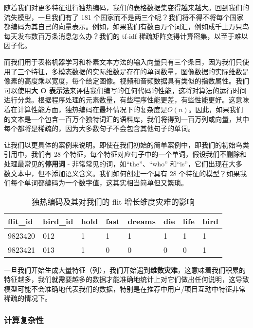 \documentclass[Chinese, 11pt, table]{diazessay} %
\begin{document}
\begin{CJK}{UTF8}{gbsn}
\begin{sloppypar}
随着我们对更多特征进行独热编码，我们的表格数据集变得越来越大。回到我们的流失模型，一旦我们有了 181 个国家而不是两三个呢？我们将不得不将每个国家都编码为其自己的向量表示。例如，如果我们有数百万个词汇，例如成千上万只鸟每天发布数百万条消息怎么办？我们的 tf-idf 稀疏矩阵变得计算密集，以至于难以因子化。

而我们用于表格机器学习和朴素文本方法的输入向量只有三个条目，因为我们只使用了三个特征，多模态数据的实际维数是存在的单词数量，图像数据的实际维数是像素的高度乘以宽度，每个给定图像。视频和音频数据具有类似的指数属性。我们可以使用\textbf{大 O 表示法}来评估我们编写的任何代码的性能，这将对算法的运行时间进行分类。根据程序处理的元素数量，有些程序性能更差，有些性能更好。这意味着在计算性能方面，独热编码在最坏情况下的复杂度是\begin{math}O(n)\end{math}。因此，如果我们的文本是一个包含一百万个独特词汇的语料库，我们将得到一百万列或向量，其中每个都将是稀疏的，因为大多数句子不会包含其他句子的单词。

让我们以更具体的案例来说明。即使在我们初始的简单案例中，即我们的初始鸟类引用中，我们有 28 个特征，每个特征对应句子中的一个单词，假设我们不删除和处理最常见的\textbf{停用词} - 非常常见的词，如“the”、“who” 和“is”，它们出现在大多数文本中，但不添加语义含义。我们如何创建一个具有 28 个特征的模型？如果我们每个单词都编码为一个数字值，这其实相当简单但又繁琐。

\begin{table}[H]
\centering
\caption{独热编码及其对我们的 flit 增长维度灾难的影响}
\begin{tabular}{|l|l|l|l|l|l|l|l|}
\hline
\rowcolor[HTML]{D5E7F7} 
flit\_id & bird\_id & hold & fast & dreams & die & life & bird \\ \hline
9823420  & 012  & 1   & 1    & 1     & 1  & 1     & 1   \\ \hline
9823421  & 013  & 1   & 0    & 0     & 0  & 0     & 1   \\ \hline
\end{tabular}
\end{table}

一旦我们开始生成大量特征（列），我们开始遇到\textbf{维数灾难}，这意味着我们积累的特征越多，我们就需要越多的数据才能准确地统计上对它们做出任何说明，这导致模型可能不会准确地代表我们的数据\citep{houle2010can}，特别是在推荐中用户/项目互动中特征非常稀疏的情况下。

\subsubsection{计算复杂性}


\end{sloppypar}
\end{CJK}
\end{document}
